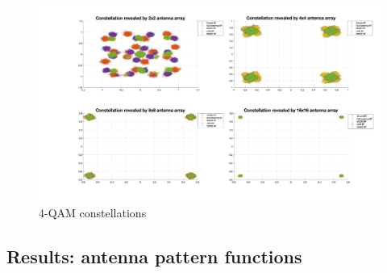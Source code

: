 \begin{figure}[ht]
    \includegraphics[width=\linewidth]{Constellations.jpg}
    \caption{4-QAM constellations}
    \label{fig:Constellations}
\end{figure}

\subsection{Results: antenna pattern functions}

